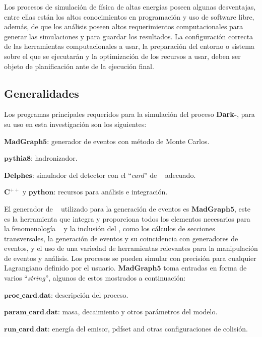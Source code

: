 Los procesos de simulación de física de altas energías poseen algunas desventajas, entre ellas están los altos conocimientos en programación y uso de software libre, además, de que los análisis poseen altos requerimientos computacionales para generar las simulaciones y para guardar los resultados. La configuración correcta de las herramientas computacionales a usar, la preparación del entorno o sistema sobre el que se ejecutarán y la optimización de los recursos a usar, deben ser objeto de planificación ante de la ejecución final.

\subsection{Generalidades}
Los programas principales requeridos para la simulación del proceso \textbf{Dark-}\SUSY, para su uso en esta investigación son los siguientes:
\begin{itemize_f}
\item  $\mathbf{MadGraph5}$: generador de eventos con método de Monte Carlos. 
\item $\mathbf{pythia8}$: hadronizador.
\item $\mathbf{Delphes}$: simulador del detector con el ``\textit{card}'' de \CMS ~ adecuado.
\item  $\mathbf{C}^{++}$ y $\mathbf{python}$: recursos para análisis e integración.
\end{itemize_f}

El generador de \MC ~ utilizado para la generación de eventos es $\mathbf{MadGraph5}$, este es la herramienta que integra y proporciona todos los elementos necesarios para la fenomenología \ME ~ y la inclusión del \SUSY, como los cálculos de secciones transversales, la generación de eventos y su coincidencia con generadores de eventos, y el uso de una variedad de herramientas relevantes para la manipulación de eventos y análisis. Los procesos se pueden simular con precisión para cualquier Lagrangiano definido por el usuario. $\mathbf{MadGraph5}$ toma entradas en forma de varios ``\textit{string}'', algunos de estos mostrados a continuación:
\begin{itemize_f}
\item  $\mathbf{proc\_card.dat}$: descripción del proceso.
\item  $\mathbf{param\_card.dat}$: masa, decaimiento y otros parámetros del modelo.
\item  $\mathbf{run\_card.dat}$: energía del emisor, pdfset and otras configuraciones de colisión.
\end{itemize_f}

